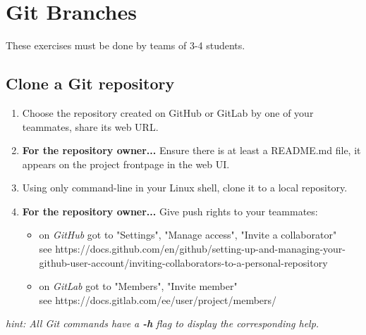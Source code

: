 
\setcounter{section}{2}



\section{Git Branches}

These exercises must be done by teams of 3-4 students.

\subsection{Clone a Git repository}  %

\begin{enumerate}
    \item Choose the repository created on GitHub or GitLab by one of your teammates, share its web URL.
    \item \textbf{For the repository owner...} Ensure there is at least a README.md file, it appears on the project frontpage in the web UI.
    \item Using only command-line in your Linux shell, clone it to a local repository.
    \item \textbf{For the repository owner...} Give push rights to your teammates:
        \begin{itemize}
            \item on \textit{GitHub} got to "Settings", "Manage access", "Invite a collaborator" \\
                  see https://docs.github.com/en/github/setting-up-and-managing-your-github-user-account/inviting-collaborators-to-a-personal-repository
            \item on \textit{GitLab} got to "Members", "Invite member" \\
                  see https://docs.gitlab.com/ee/user/project/members/
        \end{itemize}
\end{enumerate}

\textit{hint: All Git commands have a \textbf{-h} flag to display the corresponding help.}

